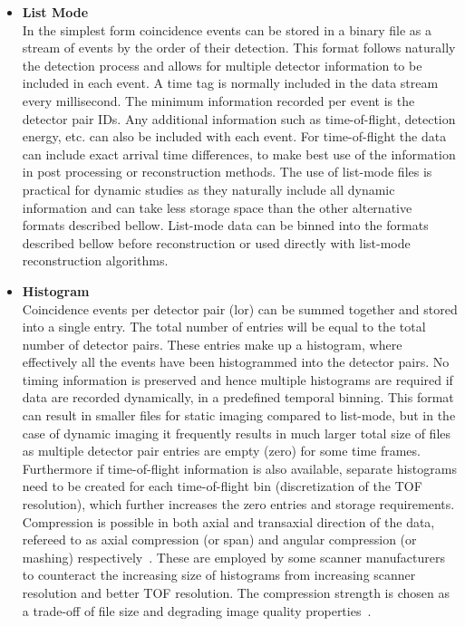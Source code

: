 \begin{itemize}

\item\textbf{List Mode}\\
In the simplest form coincidence events can be stored in a binary file as a stream of events by the order of their detection. This format follows naturally the detection process and allows for multiple detector information to be included in each event. A time tag is normally included in the data stream every millisecond. The minimum information recorded per event is the detector pair IDs. Any additional information such as time-of-flight, detection energy, etc. can also be included with each event. For time-of-flight the data can include exact arrival time differences, to make best use of the information in post processing or reconstruction methods.
The use of list-mode files is practical for dynamic studies as they naturally include all dynamic information and can take less storage space than the other alternative formats described bellow. List-mode data can be binned into the formats described bellow before reconstruction or used directly with list-mode reconstruction algorithms. 

\item\textbf{Histogram}\\
Coincidence events per detector pair (\gls{lor}) can be summed together and stored into a single entry. The total number of entries will be equal to the total number of detector pairs. These entries make up a histogram, where effectively all the events have been histogrammed into the detector pairs. No timing information is preserved and hence multiple histograms are required if data are recorded dynamically, in a predefined temporal binning. 
This format can result in smaller files for static imaging compared to list-mode, but in the case of dynamic imaging it frequently results in much larger total size of files as multiple detector pair entries are empty (zero) for some time frames. Furthermore if time-of-flight information is also available, separate histograms need to be created for each time-of-flight bin (discretization of the TOF resolution), which further increases the zero entries and storage requirements. 
Compression is possible in both axial and transaxial direction of the data, refereed to as axial compression (or span) and angular compression (or mashing) respectively~\cite{Fahey2002}. These are employed by some scanner manufacturers to counteract the increasing size of histograms from increasing scanner resolution and better TOF resolution. The compression strength is chosen as a trade-off of file size and degrading image quality properties~\cite{Belzunce2017}. 


\end{itemize}
